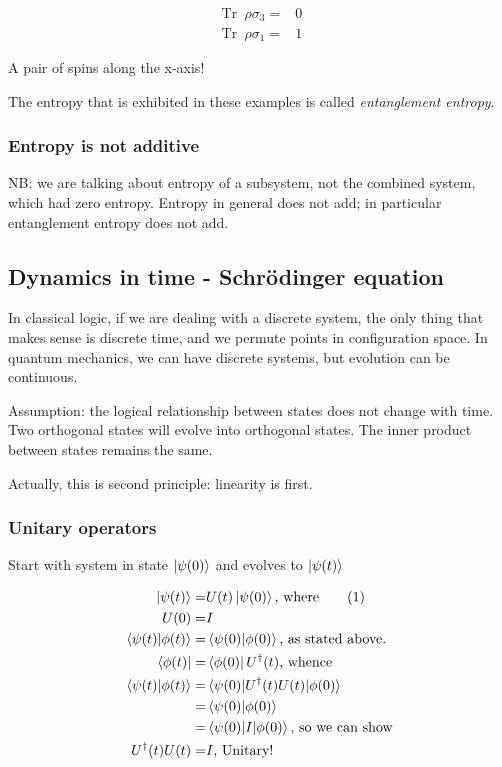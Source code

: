 \documentclass[]{article}
\newcommand\numberthis{\addtocounter{equation}{1}\tag{\theequation}}
\DeclareMathOperator{\Tr}{Tr \;}
\begin{document}
\begin{align*}
	\Tr \rho \sigma_3 =& 0\\
	\Tr \rho \sigma_1 =& 1
\end{align*}

A pair of spins along the x-axis!

The entropy that is exhibited in these examples is called \emph{entanglement entropy}. 



\subsubsection{Entropy is not additive}

NB: we are talking about entropy of a subsystem, not the combined system, which had zero entropy. Entropy in general does not add; in particular entanglement entropy does not add.

\subsection{Dynamics in time - Schr\"odinger equation}

In classical logic, if we are dealing with a discrete system, the only thing that makes sense is discrete time, and we permute points in configuration space. In quantum mechanics, we can have discrete systems, but evolution can be continuous.

Assumption: the logical relationship between states does not change with time. Two orthogonal states will evolve into orthogonal states. The inner product between states remains the same.

Actually, this is second principle: linearity is first.


\subsubsection{Unitary operators}\label{sect:unitary}

Start with system in state $\ket{\psi(0)}$ and evolves to $\ket{\psi(t)}$

\begin{align*}
	\ket{\psi(t)} =& U(t) \ket{\psi(0)} \text{, where} \numberthis \label{eq:evolution_time}\\
	U(0) =& I\\
	\braket{\psi(t)\vert\phi(t)} =& \braket{\psi(0)\vert\phi(0)} \text{, as stated above.}\\
	\bra{\phi(t)} =& \bra{\phi(0)} U^\dagger(t) \text{, whence}\\
	\braket{\psi(t)\vert\phi(t)} =& \braket{\psi(0)\vert U^\dagger(t) U(t)\vert\phi(0)}\\
	=& \braket{\psi(0)\vert\phi(0)} \\
	=& \braket{\psi(0)\vert I \vert \phi(0)} \text{, so we can show}\\
	 U^\dagger(t) U(t)=& I \text {, Unitary!}
\end{align*}
\end{document}
